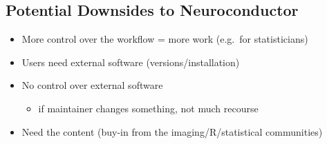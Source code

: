 \documentclass[final]{beamer}\usepackage[]{graphicx}\usepackage[]{color}
\begin{document}
\begin{frame}[fragile]
\begin{table}[!htb]
\begin{minipage}{0.36\linewidth}

\vspace*{-0.8cm}
\section{Potential Downsides to Neuroconductor}
\begin{itemize}
\item More control over the workflow = more work (e.g.~for statisticians)
\item Users need external software (versions/installation)
\item No control over external software
  \begin{itemize}
    \item if maintainer changes something, not much recourse
  \end{itemize}
\item Need the content (buy-in from the imaging/R/statistical communities)
\end{itemize}


\end{minipage}
\end{table}
\end{frame}
\end{document}
